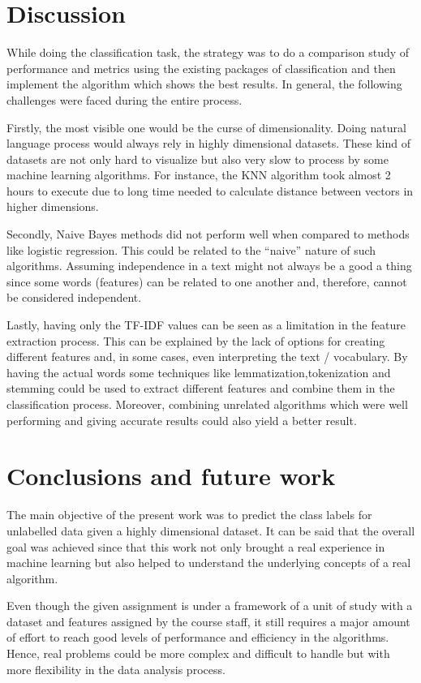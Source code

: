 \documentclass[letterpaper,10pt]{article}
\theoremstyle{mytheor}
\begin{document}
\section{Discussion}

While doing the classification task, the strategy was to do a comparison study of performance and metrics using the existing packages of classification and then implement the algorithm which shows the best results. In general, the following challenges were faced during the entire process.

Firstly, the most visible one would be the curse of dimensionality. Doing natural language process would always rely in highly dimensional datasets. These kind of datasets are not only hard to visualize but also very slow to process by some machine learning algorithms. For instance, the KNN algorithm took almost 2 hours to execute due to long time needed to calculate distance between vectors in higher dimensions.

Secondly, Naive Bayes methods did not perform well when compared to methods like logistic regression. This could be related to the “naive” nature of such algorithms. Assuming independence in a text might not always be a good a thing since some words (features) can be related to one another and, therefore, cannot be considered independent.

Lastly, having only the TF-IDF values can be seen as a limitation in the feature extraction process. This can be explained by the lack of options for creating different features and, in some cases, even interpreting the text / vocabulary. By having the actual words some techniques like lemmatization,tokenization and stemming could be used to extract different features and combine them in the classification process. Moreover, combining unrelated algorithms which were well performing and giving accurate results could also yield a better result. 

\section{Conclusions and future work}

The main objective of the present work was to predict the class labels for unlabelled data given a highly dimensional dataset. It can be said that the overall goal was achieved since that this work not only brought a real experience in machine learning but also helped to understand the underlying concepts of a real algorithm.

Even though the given assignment is under a framework of a unit of study with a dataset and features assigned by the course staff, it still requires a major amount of effort to reach good levels of performance and efficiency in the algorithms. Hence, real problems could be more complex and difficult to handle but with more flexibility in the data analysis process.
\end{document}
